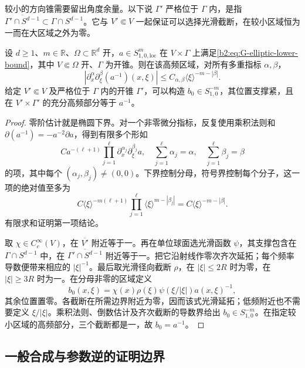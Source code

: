 较小的方向锥需要留出角度余量。以下说 \(\Gamma'\) 严格位于 \(\Gamma\) 内，是指 \(\overline{\Gamma'\cap S^{d-1}}\subset\Gamma\cap S^{d-1}\)。它与 \(V'\Subset V\) 一起保证可以选择光滑截断，在较小区域恒为一而在大区域之外为零。

\begin{proposition}[椭圆符号的倒数估计]
\label{b2:prop:G-elliptic-reciprocal}
设 \(d\ge1\)、\(m\in\mathbb R\)、\(\Omega\subset\mathbb R^d\) 开，\(a\in S^m_{1,0,\mathrm{loc}}\) 在 \(V\times\Gamma\) 上满足\eqref{b2:eq:G-elliptic-lower-bound}，其中 \(V\Subset\Omega\) 开、\(\Gamma\) 为开锥。则在该高频区域，对所有多重指标 \(\alpha,\beta\)，
\[
 \left|\partial_x^\alpha\partial_\xi^\beta(a^{-1})(x,\xi)\right|
 \le C_{\alpha,\beta}\langle\xi\rangle^{-m-|\beta|}.
\]
给定 \(V'\Subset V\) 及严格位于 \(\Gamma\) 内的开锥 \(\Gamma'\)，可以构造 \(b_0\in S^{-m}_{1,0}\)，其位置支撑紧，且在 \(V'\times\Gamma'\) 的充分高频部分等于 \(a^{-1}\)。
\end{proposition}
\begin{proof}
零阶估计就是椭圆下界。对一个非零微分指标，反复使用乘积法则和 \(\partial(a^{-1})=-a^{-2}\partial a\)，得到有限多个形如
\[
 C a^{-(\ell+1)}
   \prod_{j=1}^\ell
       \partial_x^{\alpha_j}\partial_\xi^{\beta_j}a,
 \quad
 \sum_{j=1}^\ell\alpha_j=\alpha,
 \quad\sum_{j=1}^\ell\beta_j=\beta
\]
的项，其中每个 \((\alpha_j,\beta_j)\ne(0,0)\)。下界控制分母，符号界控制每个分子，这一项的绝对值至多为
\[
 C\langle\xi\rangle^{-m(\ell+1)}
       \prod_{j=1}^\ell\langle\xi\rangle^{m-|\beta_j|}
 =C\langle\xi\rangle^{-m-|\beta|}.
\]
有限求和证明第一项结论。

取 \(\chi\in C_c^\infty(V)\)，在 \(\overline{V'}\) 附近等于一。再在单位球面选光滑函数 \(\psi\)，其支撑包含在 \(\Gamma\cap S^{d-1}\) 中，在 \(\overline{\Gamma'\cap S^{d-1}}\) 附近等于一。把它沿射线作零次齐次延拓；每个频率导数便带来相应的 \(|\xi|^{-1}\)。最后取光滑径向截断 \(\rho\)，在 \(|\xi|\le2R\) 时为零，在 \(|\xi|\ge3R\) 时为一。在分母非零的区域定义
\[
 b_0(x,\xi)=\chi(x)\rho(\xi)\psi(\xi/|\xi|)a(x,\xi)^{-1},
\]
其余位置置零。各截断在所需边界附近为零，因而该式光滑延拓；低频附近也不需要定义 \(\xi/|\xi|\)。乘积法则、倒数估计及齐次截断的导数界给出 \(b_0\in S^{-m}_{1,0}\)。在指定较小区域的高频部分，三个截断都是一，故 \(b_0=a^{-1}\)。
\end{proof}

\subsection{一般合成与参数逆的证明边界}
\label{b2:subsec:G-general-calculus}

